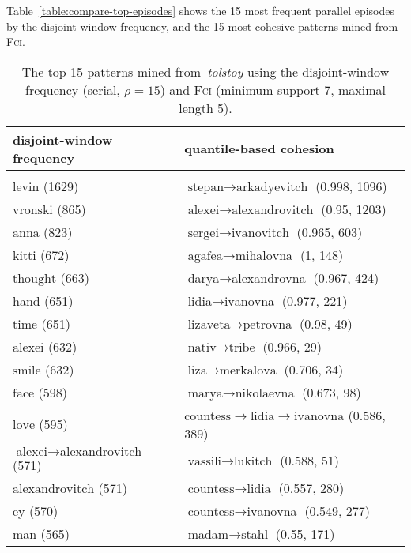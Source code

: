Table~\ref{table:compare-top-episodes} shows the 15 most frequent parallel episodes by the disjoint-window frequency, and the 15 most cohesive patterns mined from \textsc{Fci}.

\begin{table}
\centering

\begin{tabulary}{\textwidth}{L|L}

disjoint-window frequency & quantile-based cohesion \\
\hline \\
$ \text{levin} $ (1629) & $ \text{stepan} \to \text{arkadyevitch} $ (0.998, 1096) \\
$ \text{vronski} $ (865) & $ \text{alexei} \to \text{alexandrovitch} $ (0.95, 1203) \\
$ \text{anna} $ (823) & $ \text{sergei} \to \text{ivanovitch} $ (0.965, 603) \\
$ \text{kitti} $ (672) & $ \text{agafea} \to \text{mihalovna} $ (1, 148) \\
$ \text{thought} $ (663) & $ \text{darya} \to \text{alexandrovna} $ (0.967, 424) \\
$ \text{hand} $ (651) & $ \text{lidia} \to \text{ivanovna} $ (0.977, 221) \\
$ \text{time} $ (651) & $ \text{lizaveta} \to \text{petrovna} $ (0.98, 49) \\
$ \text{alexei} $ (632) & $ \text{nativ} \to \text{tribe} $ (0.966, 29) \\
$ \text{smile} $ (632) & $ \text{liza} \to \text{merkalova} $ (0.706, 34) \\
$ \text{face} $ (598) & $ \text{marya} \to \text{nikolaevna} $ (0.673, 98) \\
$ \text{love} $ (595) & $ \text{countess} \to \text{lidia} \to \text{ivanovna} $ (0.586, 389) \\
$ \text{alexei} \to \text{alexandrovitch} $ (571) & $ \text{vassili} \to \text{lukitch} $ (0.588, 51) \\
$ \text{alexandrovitch} $ (571) & $ \text{countess} \to \text{lidia} $ (0.557, 280) \\
$ \text{ey} $ (570) & $ \text{countess} \to \text{ivanovna} $ (0.549, 277) \\
$ \text{man} $ (565) & $ \text{madam} \to \text{stahl} $ (0.55, 171) \\

\end{tabulary}

\caption{The top 15 patterns mined from~\emph{tolstoy} using the disjoint-window frequency (serial, $ \rho = 15 $) and \textsc{Fci} (minimum support 7, maximal length 5).}
\end{table}
